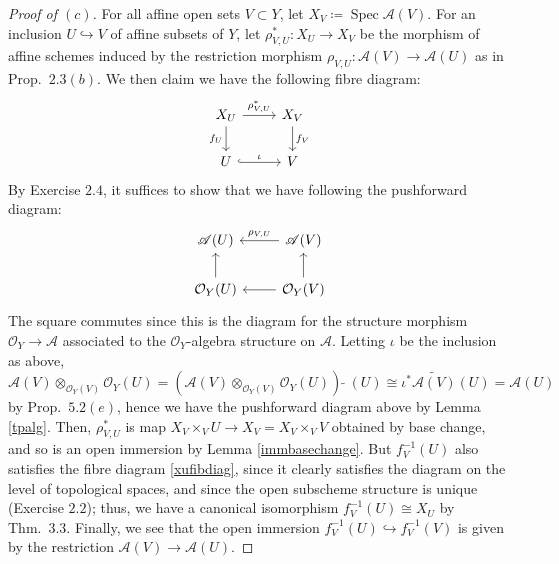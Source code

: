 \documentclass[10pt]{article}
\theoremstyle{definition}
\theoremstyle{remark}
\numberwithin{equation}{section}
\numberwithin{figure}{subsubsection}
\DeclareMathOperator{\Spec}{Spec}
\newcommand{\OO}{\mathcal{O}}
\newcommand{\Aa}{\mathscr{A}}
\begin{document}
\begin{proof}[Proof of $(c)$]
  For all affine open sets $V \subset Y$, let $X_V \coloneqq \Spec\Aa(V)$. For an inclusion $U \hookrightarrow V$ of affine subsets of $Y$, let $\rho^*_{V,U} \colon X_U \to X_V$ be the morphism of affine schemes induced by the restriction morphism $\rho_{V,U} \colon \Aa(V) \to \Aa(U)$ as in Prop.~$2.3(b)$. We then claim we have the following fibre diagram:
  \begin{equation}\label{xufibdiag}
    \begin{tikzcd}
      X_U \rar{\rho^*_{V,U}}\dar[swap]{f_U} & X_V\dar{f_V}\\
      U \rar[hook]{\iota} & V
    \end{tikzcd}
  \end{equation}
  By Exercise $2.4$, it suffices to show that we have following the pushforward diagram:
  \begin{equation*}
    \begin{tikzcd}
      \Aa(U) & \arrow{l}[swap]{\rho_{V,U}} \Aa(V)\\
      \OO_Y(U)\uar & \arrow{l} \OO_Y(V)\uar
    \end{tikzcd}
  \end{equation*}
  The square commutes since this is the diagram for the structure morphism $\OO_Y \to \Aa$ associated to the $\OO_Y$-algebra structure on $\Aa$. Letting $\iota$ be the inclusion as above,
  \begin{equation*}
    \Aa(V) \otimes_{\OO_Y(V)} \OO_Y(U) = (\Aa(V) \otimes_{\OO_Y(V)} \OO_Y(U))\:\tilde{}\:(U) \cong \iota^*\widetilde{\Aa(V)}(U) = \Aa(U)
  \end{equation*}
  by Prop.~$5.2(e)$, hence we have the pushforward diagram above by Lemma \ref{tpalg}. Then, $\rho_{V,U}^*$ is map $X_V \times_V U \to X_V = X_V \times_V V$ obtained by base change, and so is an open immersion by Lemma \ref{immbasechange}. But $f_V^{-1}(U)$ also satisfies the fibre diagram \eqref{xufibdiag}, since it clearly satisfies the diagram on the level of topological spaces, and since the open subscheme structure is unique (Exercise $2.2$); thus, we have a canonical isomorphism $f_V^{-1}(U) \cong X_U$ by Thm.~3.3. Finally, we see that the open immersion $f_V^{-1}(U) \hookrightarrow f_V^{-1}(V)$ is given by the restriction $\Aa(V) \to \Aa(U)$.

\end{proof}
\end{document}
